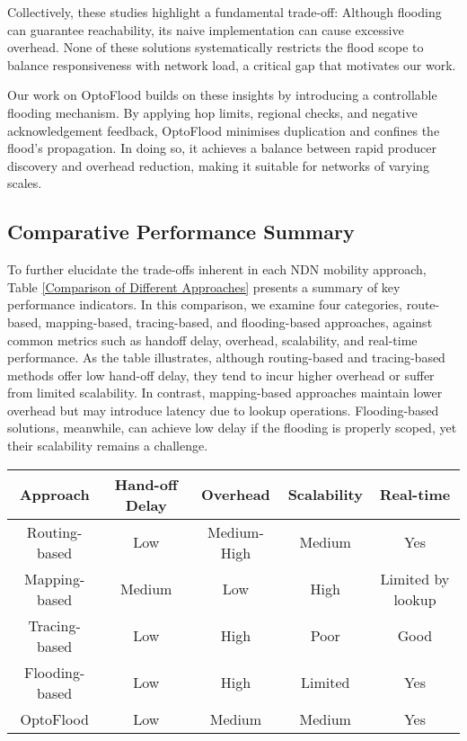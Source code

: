 Collectively, these studies highlight a fundamental trade-off: Although flooding can guarantee reachability, its naive implementation can cause excessive overhead. None of these solutions systematically restricts the flood scope to balance responsiveness with network load, a critical gap that motivates our work.

Our work on OptoFlood builds on these insights by introducing a controllable flooding mechanism. By applying hop limits, regional checks, and negative acknowledgement feedback, OptoFlood minimises duplication and confines the flood’s propagation. In doing so, it achieves a balance between rapid producer discovery and overhead reduction, making it suitable for networks of varying scales.

\subsection{Comparative Performance Summary}
To further elucidate the trade-offs inherent in each NDN mobility approach, Table \ref{Comparison of Different Approaches} presents a summary of key performance indicators. In this comparison, we examine four categories, route-based, mapping-based, tracing-based, and flooding-based approaches, against common metrics such as handoff delay, overhead, scalability, and real-time performance. As the table illustrates, although routing-based and tracing-based methods offer low hand-off delay, they tend to incur higher overhead or suffer from limited scalability. In contrast, mapping-based approaches maintain lower overhead but may introduce latency due to lookup operations. Flooding-based solutions, meanwhile, can achieve low delay if the flooding is properly scoped, yet their scalability remains a challenge.

\begin{table*}[t]
    \centering
    \begin{tabular}{|c|c|c|c|c|}
        \hline
        \textbf{Approach} & \textbf{Hand-off Delay} & \textbf{Overhead} & \textbf{Scalability} & \textbf{Real-time} \\ \hline
        Routing-based & Low & Medium-High & Medium & Yes \\ \hline
        Mapping-based & Medium & Low & High & Limited by lookup \\ \hline
        Tracing-based & Low & High & Poor & Good \\ \hline
        Flooding-based & Low & High & Limited & Yes \\ \hline
        OptoFlood & Low & Medium & Medium & Yes \\ \hline
    \end{tabular}
    \caption{Comparison of Different Approaches}
    \label{Comparison of Different Approaches}
\end{table*}
